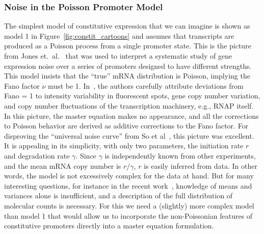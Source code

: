 \subsubsection{Noise in the Poisson Promoter Model}
The simplest model of constitutive expression that we can imagine
is shown as model 1 in Figure~\ref{fig:constit_cartoons} and
assumes that
transcripts are produced as a Poisson process from a single promoter state. 
This is the picture from Jones et.\ al.~\cite{Jones2014} that was used to
interpret a systematic study of gene expression noise over a series of
promoters designed to have different strengths.   This
model insists that the ``true'' mRNA distribution is Poisson, implying the Fano
factor $\nu$ must be 1. In~\cite{Jones2014}, the authors carefully attribute
deviations from Fano = 1 to intensity variability in fluorescent spots, gene
copy number variation, and copy number fluctuations of the transcription
machinery, e.g., RNAP itself. In this picture, the master equation makes no
appearance, and all the corrections to Poisson behavior are derived as additive
corrections to the Fano factor. For disproving the ``universal noise curve''
from So et al~\cite{So2011}, this picture was excellent. It is appealing in its
simplicity, with only two parameters, the initiation rate $r$ and degradation
rate $\gamma$. Since $\gamma$ is independently known from other experiments, and
the mean mRNA copy number is $r/\gamma$, $r$ is easily inferred from data. In
other words, the model is not excessively complex for the data at hand. But for
many interesting questions, for instance in the recent work~, knowledge of means and variances alone is
insufficient, and a description of the full distribution of molecular counts is
necessary. For this we need a (slightly) more complex model than model 1 that
would allow us to incorporate the non-Poissonian features of constitutive
promoters directly into a master equation formulation.


